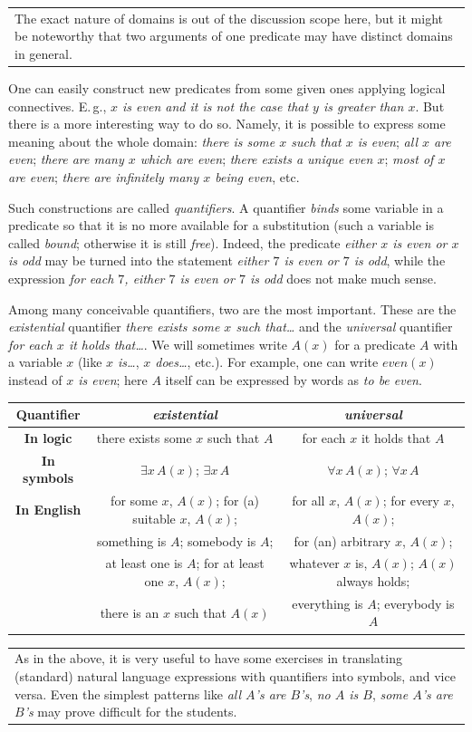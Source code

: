 \documentclass[12pt,notitlepage]{article}
\theoremstyle{plain}
\theoremstyle{definition}
\theoremstyle{plain}
\newcommand{\1}{\mathbf{1}}
\newcommand{\0}{\mathbf{0}}
\newcommand{\mcomm}[1]{
\medskip\noindent\begin{tabular}{| l}
\parbox{0.99\textwidth}{{\small
#1 }}\end{tabular}
\smallskip}
\begin{document}
\mcomm{The exact nature of domains is out of the discussion scope here, but it might be noteworthy that two arguments of one predicate may have distinct domains in general.}

One can easily construct new predicates from some given ones applying logical connectives. E.\,g., \emph{$x$ is even and it is not the case that $y$ is greater than $x$}. But there is a more interesting way to do so. Namely, it is possible to express some meaning about the whole domain: \emph{there is some $x$ such that $x$ is even}; \emph{all $x$ are even}; \emph{there are many $x$ which are even}; \emph{there exists a unique even $x$}; \emph{most of $x$ are even}; \emph{there are infinitely many $x$ being even}, etc.

Such constructions are called \emph{quantifiers}. A quantifier \emph{binds} some variable in a predicate so that it is no more available for a substitution (such a variable is called \emph{bound}; otherwise it is still \emph{free}). Indeed, the predicate \emph{either $x$ is even or $x$ is odd} may be turned into the statement \emph{either $7$ is even or $7$ is odd}, while the expression \emph{for each $7$, either $7$ is even or $7$ is odd} does not make much sense.

Among many conceivable quantifiers, two are the most important. These are the \emph{existential} quantifier \emph{there exists some $x$ such that\dots} and the \emph{universal} quantifier \emph{for each $x$ it holds that\dots}. We will sometimes write $A(x)$ for a predicate $A$ with a variable $x$ (like \emph{$x$ is\dots}, \emph{$x$ does\dots}, etc.). For example, one can write $even(x)$ instead of \emph{$x$ is even}; here $A$ itself can be expressed by words as \emph{to be even}.

\begin{center}
\begin{tabular}{|c | c | c |}
\hline
\bf Quantifier & \it existential & \it universal \\
\hline
\bf In logic & there exists some $x$ such that $A$  & for each $x$ it holds that $A$ \\
\hline
\bf In symbols & $\exists x\, A(x)$; $\exists x\, A$   & $\forall x\, A(x)$; $\forall x\, A$ \\
\hline
\bf In English & for some $x$, $A(x)$; for (a) suitable $x$, $A(x)$;   & for all $x$, $A(x)$; 
for every $x$, $A(x)$; \\
& something is $A$; somebody is $A$; &  for (an) arbitrary $x$, $A(x)$; \\
& at least one is $A$; for at least one $x$, $A(x)$;  & whatever $x$ is, $A(x)$; $A(x)$ always holds;  \\
& there is an $x$ such that $A(x)$ & everything is $A$; everybody is $A$  \\
\hline
\end{tabular}
\end{center}
\mcomm{As in the above, it is very useful to have some exercises in translating (standard) natural language expressions with quantifiers into symbols, and vice versa. Even the simplest patterns like \emph{all $A$'s are $B$'s}, \emph{no $A$ is $B$}, \emph{some $A$'s are $B$'s} may prove difficult for the students.}
\end{document}
